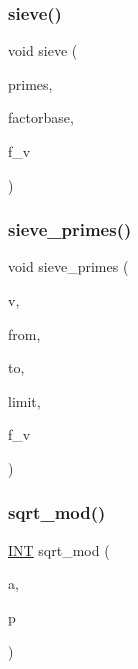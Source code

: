 \subsubsection{\texorpdfstring{sieve()}{sieve()}}
{\footnotesize\ttfamily void sieve (\begin{DoxyParamCaption}\item[{\mbox{\hyperlink{class_vector}{Vector}} \&}]{primes,  }\item[{\mbox{\hyperlink{galois_8h_a09fddde158a3a20bd2dcadb609de11dc}{I\+NT}}}]{factorbase,  }\item[{\mbox{\hyperlink{galois_8h_a09fddde158a3a20bd2dcadb609de11dc}{I\+NT}}}]{f\+\_\+v }\end{DoxyParamCaption})}

\mbox{\label{global_8_c_aee0955bf933f6d61c37e426a4254e1bd}} 
\subsubsection{\texorpdfstring{sieve\+\_\+primes()}{sieve\_primes()}}
{\footnotesize\ttfamily void sieve\+\_\+primes (\begin{DoxyParamCaption}\item[{\mbox{\hyperlink{class_vector}{Vector}} \&}]{v,  }\item[{\mbox{\hyperlink{galois_8h_a09fddde158a3a20bd2dcadb609de11dc}{I\+NT}}}]{from,  }\item[{\mbox{\hyperlink{galois_8h_a09fddde158a3a20bd2dcadb609de11dc}{I\+NT}}}]{to,  }\item[{\mbox{\hyperlink{galois_8h_a09fddde158a3a20bd2dcadb609de11dc}{I\+NT}}}]{limit,  }\item[{\mbox{\hyperlink{galois_8h_a09fddde158a3a20bd2dcadb609de11dc}{I\+NT}}}]{f\+\_\+v }\end{DoxyParamCaption})}

\mbox{\label{global_8_c_a8b9a700cdc4cf3ca42c28e6435945ade}} 
\subsubsection{\texorpdfstring{sqrt\+\_\+mod()}{sqrt\_mod()}}
{\footnotesize\ttfamily \mbox{\hyperlink{galois_8h_a09fddde158a3a20bd2dcadb609de11dc}{I\+NT}} sqrt\+\_\+mod (\begin{DoxyParamCaption}\item[{\mbox{\hyperlink{galois_8h_a09fddde158a3a20bd2dcadb609de11dc}{I\+NT}}}]{a,  }\item[{\mbox{\hyperlink{galois_8h_a09fddde158a3a20bd2dcadb609de11dc}{I\+NT}}}]{p }\end{DoxyParamCaption})}


